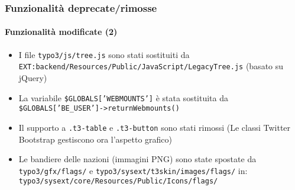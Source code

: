 \begin{frame}[fragile]
	\frametitle{Funzionalità deprecate/rimosse}
	\framesubtitle{Funzionalità modificate (2)}

	\begin{itemize}

		\item I file
			\small\texttt{typo3/js/tree.js}\normalsize\space
			sono stati sostituiti da
			\small\texttt{EXT:backend/Resources/Public/JavaScript/LegacyTree.js}\normalsize\newline
			(basato su jQuery)

		\item La variabile
			\small\texttt{\$GLOBALS['WEBMOUNTS']}\normalsize\space
			è stata sostituita da
			\small\texttt{\$GLOBALS['BE\_USER']->returnWebmounts()}\normalsize

		\item Il supporto a
			\small\texttt{.t3-table}\normalsize\space
			e
			\small\texttt{.t3-button}\normalsize\space
			sono stati rimossi\newline
			\small
				(Le classi Twitter Bootstrap gestiscono ora l'aspetto grafico)
			\normalsize

		\item Le bandiere delle nazioni (immagini PNG) sono state spostate da
			\small\texttt{typo3/gfx/flags/}\normalsize
			e
			\small\texttt{typo3/sysext/t3skin/images/flags/}\normalsize\newline
			in: \small\texttt{typo3/sysext/core/Resources/Public/Icons/flags/}\normalsize

	\end{itemize}

\end{frame}


